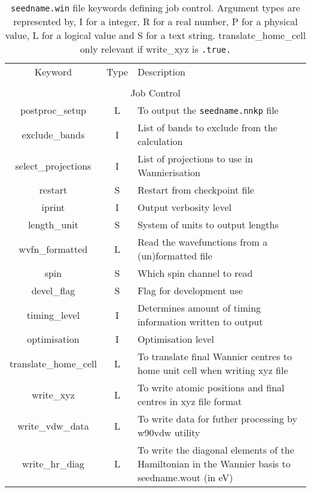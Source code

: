\clearpage

\begin{table}
\begin{center}
\begin{tabular}{|c|c|p{6cm}|}
\hline
Keyword & Type & Description \\
        &      &             \\
\hline\hline
\multicolumn{3}{|c|}{Job Control} \\
\hline
{\sc postproc\_setup }   & L & To output the {\tt seedname.nnkp} file \\
{\sc exclude\_bands }   & I & List of bands to exclude from the calculation \\
{\sc select\_projections }   & I & List of projections to use in Wannierisation \\
{\sc restart }   & S & Restart from checkpoint file \\
{\sc iprint }   & I & Output verbosity level \\
{\sc length\_unit }   & S & System of units to output lengths \\
{\sc wvfn\_formatted }   & L & Read the wavefunctions from a  (un)formatted file  \\
{\sc spin }   & S & Which spin channel to read \\
{\sc devel\_flag }   & S & Flag for development use \\
{\sc timing\_level } & I & Determines amount of timing information
written to output \\
{\sc optimisation } & I & Optimisation level \\
{\sc translate\_home\_cell } & L & To translate final Wannier centres
to home unit cell when writing xyz file\\
{\sc write\_xyz }  & L & To write atomic positions and final centres in xyz file format \\
{\sc write\_vdw\_data }  & L & To write data for futher processing by w90vdw utility\\
{\sc write\_hr\_diag }  & L & To write the diagonal elements of
the Hamiltonian in the Wannier basis to seedname.wout (in eV)\\
\hline
\end{tabular}
\caption[win file keywords.]
{{\tt seedname.win} file keywords defining job control.  Argument types
are represented by, I for a integer, R for a real number, P for a
physical value, L for a logical value and S for a text string. {\sc
  translate\_home\_cell } only relevant if {\sc write\_xyz} is
\texttt{.true.}}
\label{parameter_keywords2}
\end{center}
\end{table}





